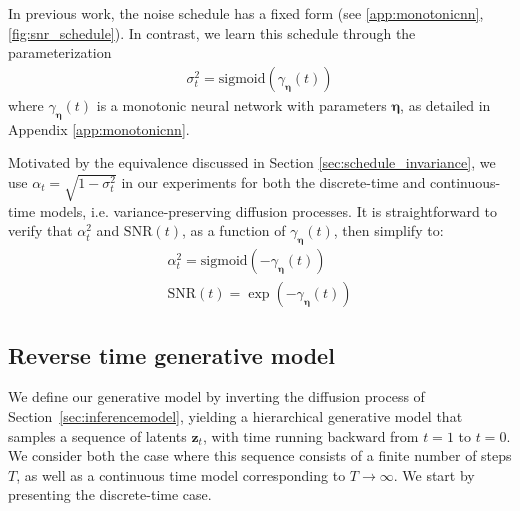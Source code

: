 \documentclass{article}
\def\rvz{{\mathbf{z}}}
\newcommand{\boldeta}{{\boldsymbol{\eta}}}
\newcommand{\snr}{\text{SNR}}
\begin{document}
In previous work, the noise schedule has a fixed form (see \cref{app:monotonicnn}, \cref{fig:snr_schedule}). In contrast, we learn this schedule through the parameterization
\begin{align}
\sigma^{2}_t = \text{sigmoid}(\gamma_{\boldeta}(t))
\end{align}
where $\gamma_{\boldeta}(t)$ is a monotonic neural network with parameters ${\boldeta}$, as detailed in Appendix \ref{app:monotonicnn}.

Motivated by the equivalence discussed in Section \ref{sec:schedule_invariance}, we use $\alpha_t = \sqrt{1 - \sigma^2_t}$ in our experiments for both the discrete-time and continuous-time models, i.e. variance-preserving diffusion processes. It is straightforward to verify that $\alpha^2_t$ and $\snr(t)$, as a function of $\gamma_{\boldeta}(t)$, then simplify to:
\begin{align}
\alpha^{2}_t = \text{sigmoid}(-\gamma_{\boldeta}(t)) \\
\snr(t) = \exp(-\gamma_{\boldeta}(t))
\end{align}




\subsection{Reverse time generative model}\label{sec:generativemodel}
We define our generative model by inverting the diffusion process of Section~\ref{sec:inferencemodel}, yielding a hierarchical generative model that samples a sequence of latents $\rvz_t$, with time running backward from $t=1$ to $t=0$.
We consider both the case where this sequence consists of a finite number of steps $T$, as well as a continuous time model corresponding to $T\rightarrow\infty$. We start by presenting the discrete-time case. 
\end{document}
